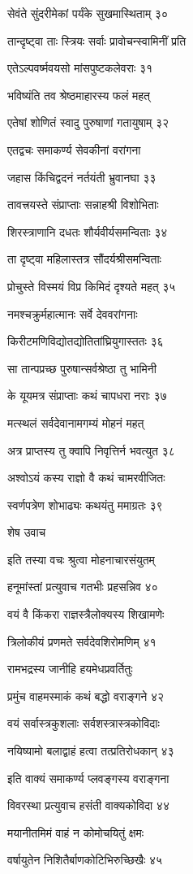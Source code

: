 सेवंते सुंदरीमेकां पर्यंके सुखमास्थिताम् ३०

तान्दृष्ट्वा ताः स्त्रियः सर्वाः प्रावोचन्स्वामिनीं प्रति

एतेऽल्पवर्ष्मवयसो मांसपुष्टकलेवराः ३१

भविष्यंति तव श्रेष्ठमाहारस्य फलं महत्

एतेषां शोणितं स्वादु पुरुषाणां गतायुषाम् ३२

एतद्वचः समाकर्ण्य सेवकीनां वरांगना

जहास किंचिद्वदनं नर्तयंती भ्रुवानघा ३३

तावत्त्रयस्ते संप्राप्ताः सन्नाहश्री विशोभिताः

शिरस्त्राणानि दधतः शौर्यवीर्यसमन्विताः ३४

ता दृष्ट्वा महिलास्तत्र सौंदर्यश्रीसमन्विताः

प्रोचुस्ते विस्मयं विप्र किमिदं दृश्यते महत् ३५

नमश्चक्रुर्महात्मानः सर्वे देववरांगनाः

किरीटमणिविद्योतद्योतितांघ्रियुगास्ततः ३६

सा तान्पप्रच्छ पुरुषान्सर्वश्रेष्ठा तु भामिनी

के यूयमत्र संप्राप्ताः कथं चापधरा नराः ३७

मत्स्थलं सर्वदेवानामगम्यं मोहनं महत्

अत्र प्राप्तस्य तु क्वापि निवृत्तिर्न भवत्युत ३८

अश्वोऽयं कस्य राज्ञो वै कथं चामरवीजितः

स्वर्णपत्रेण शोभाढ्यः कथयंतु ममाग्रतः ३९

शेष उवाच

इति तस्या वचः श्रुत्वा मोहनाचारसंयुतम्

हनूमांस्तां प्रत्युवाच गतभीः प्रहसन्निव ४०

वयं वै किंकरा राज्ञस्त्रैलोक्यस्य शिखामणेः

त्रिलोकीयं प्रणमते सर्वदेवशिरोमणिम् ४१

रामभद्रस्य जानीहि हयमेधप्रवर्तितुः

प्रमुंच वाहमस्माकं कथं बद्धो वराङ्गने ४२

वयं सर्वास्त्रकुशलाः सर्वशस्त्रास्त्रकोविदाः

नयिष्यामो बलाद्वाहं हत्वा तत्प्रतिरोधकान् ४३

इति वाक्यं समाकर्ण्य प्लवङ्गस्य वराङ्गना

विवरस्था प्रत्युवाच हसंती वाक्यकोविदा ४४

मयानीतमिमं वाहं न कोमोचयितुं क्षमः

वर्षायुतेन निशितैर्बाणकोटिभिरुच्छिखैः ४५


